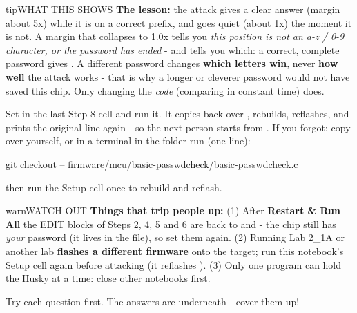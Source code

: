 \documentclass[11pt,letterpaper]{article}
\begin{document}
\begin{guidecallout}{tip}{WHAT THIS SHOWS}
\textbf{The lesson:} the attack gives a clear answer (margin about 5x) while it is on a correct prefix, and goes quiet
(about 1x) the moment it is not. A margin that collapses to 1.0x tells you \emph{this position is not an a-z / 0-9
character, or the password has ended} - and  tells you which: a correct, complete password gives
. A different password changes \textbf{which letters win}, never \textbf{how well} the attack
works - that is why a longer or cleverer password would not have saved this chip. Only changing the \emph{code}
(comparing in constant time) does.
\end{guidecallout}


Set  in the last Step 8 cell and run it. It copies
 back over , rebuilds, reflashes, and prints the
original line again - so the next person starts from . If you forgot: copy
 over  yourself, or in a terminal in the
 folder run (one line):

\begin{guidecode}
git checkout -- firmware/mcu/basic-passwdcheck/basic-passwdcheck.c
\end{guidecode}

then run the Setup cell once to rebuild and reflash.

\begin{guidecallout}{warn}{WATCH OUT}
\textbf{Things that trip people up:} (1) After \textbf{Restart \& Run All} the EDIT blocks of Steps 2, 4, 5 and 6 are
back to  and  - the chip still has \emph{your} password (it lives in
the file), so set them again. (2) Running Lab 2\_1A or another lab \textbf{flashes a different firmware} onto the
target; run this notebook's Setup cell again before attacking (it reflashes ). (3) Only one
program can hold the Husky at a time: close other notebooks first.
\end{guidecallout}

\Needspace{173pt}


Try each question first. The answers are underneath - cover them up!
\end{document}

